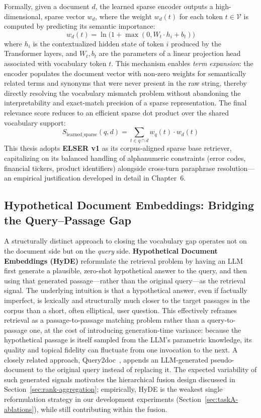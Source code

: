 Formally, given a document $d$, the learned sparse encoder outputs a high-dimensional, sparse vector $w_d$, where the weight $w_d(t)$ for each token $t \in \mathcal{V}$ is computed by predicting its semantic importance:
\begin{equation}
w_d(t) = \ln\big(1 + \max(0, W_t \cdot h_i + b_t)\big)
\end{equation}
where $h_i$ is the contextualized hidden state of token $i$ produced by the Transformer layers, and $W_t, b_t$ are the parameters of a linear projection head associated with vocabulary token $t$. This mechanism enables \textit{term expansion}: the encoder populates the document vector with non-zero weights for semantically related terms and synonyms that were never present in the raw string, thereby directly resolving the vocabulary mismatch problem without abandoning the interpretability and exact-match precision of a sparse representation. The final relevance score reduces to an efficient sparse dot product over the shared vocabulary support:
\begin{equation}
S_{\text{learned\_sparse}}(q,d) = \sum_{t \in q \cap d} w_q(t) \cdot w_d(t)
\end{equation}
This thesis adopts \textbf{ELSER v1} as its corpus-aligned sparse base retriever, capitalizing on its balanced handling of alphanumeric constraints (error codes, financial tickers, product identifiers) alongside cross-turn paraphrase resolution---an empirical justification developed in detail in Chapter~6.

\subsection{Hypothetical Document Embeddings: Bridging the Query--Passage Gap}

A structurally distinct approach to closing the vocabulary gap operates not on the document side but on the \textit{query} side. \textbf{Hypothetical Document Embeddings (HyDE)} \citep{gao2023precise} reformulate the retrieval problem by having an LLM first generate a plausible, zero-shot hypothetical answer to the query, and then using that generated passage---rather than the original query---as the retrieval signal. The underlying intuition is that a hypothetical answer, even if factually imperfect, is lexically and structurally much closer to the target passages in the corpus than a short, often elliptical, user question. This effectively reframes retrieval as a passage-to-passage matching problem rather than a query-to-passage one, at the cost of introducing generation-time variance: because the hypothetical passage is itself sampled from the LLM's parametric knowledge, its quality and topical fidelity can fluctuate from one invocation to the next. A closely related approach, Query2doc~\citep{wang2023query2doc}, appends an LLM-generated pseudo-document to the original query instead of replacing it. The expected variability of such generated signals motivates the hierarchical fusion design discussed in Section~\ref{sec:rank-aggregation}; empirically, HyDE is the weakest single reformulation strategy in our development experiments (Section~\ref{sec:taskA-ablations}), while still contributing within the fusion.

